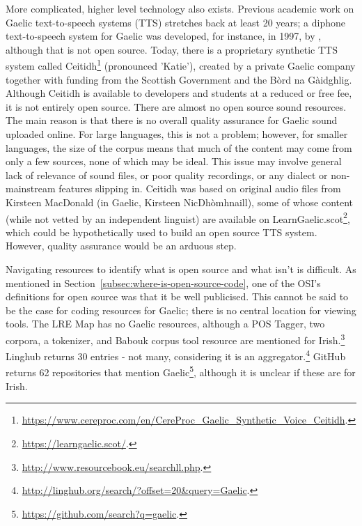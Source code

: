  More complicated, higher level technology also exists. Previous academic work on Gaelic text-to-speech systems (TTS) stretches back at least 20 years; a diphone text-to-speech system for Gaelic was developed, for instance, in 1997, by \citet{wolters1997diphone}, although that is not open source. Today, there is a proprietary synthetic TTS system called Ceitidh\footnote{\href{https://www.cereproc.com/en/CereProc_Gaelic_Synthetic_Voice_Ceitidh}{https://www.cereproc.com/en/CereProc\_Gaelic\_Synthetic\_Voice\_Ceitidh}. } (pronounced 'Katie'), created by a private Gaelic company together with funding from the Scottish Government and the B\`ord na G\`aidghlig. Although Ceitidh is available to developers and students at a reduced or free fee, it is not entirely open source. There are almost no open source sound resources. The main reason is that there is no overall quality assurance for Gaelic sound uploaded online. For large languages, this is not a problem; however, for smaller languages, the size of the corpus means that much of the content may come from only a few sources, none of which may be ideal. This issue may involve general lack of relevance of sound files, or poor quality recordings, or any dialect or non-mainstream features slipping in. Ceitidh was based on original audio files from Kirsteen MacDonald (in Gaelic, Kirsteen NicDh\`{o}mhnaill), some of whose content (while not vetted by an independent linguist) are available on LearnGaelic.scot\footnote{\href{https://learngaelic.scot/}{https://learngaelic.scot/}. }, which could be hypothetically used to build an open source TTS system. However, quality assurance would be an arduous step.

Navigating resources to identify what is open source and what isn't is difficult. As mentioned in Section~\ref{subsec:where-is-open-source-code}, one of the OSI's definitions for open source was that it be well publicised. This cannot be said to be the case for coding resources for Gaelic; there is no central location for viewing tools. The LRE Map has no Gaelic resources, although a POS Tagger, two corpora, a tokenizer, and Babouk corpus tool resource are mentioned for Irish.\footnote{\href{http://www.resourcebook.eu/searchll.php}{http://www.resourcebook.eu/searchll.php}. } Linghub returns 30 entries - not many, considering it is an aggregator.\footnote{\href{http://linghub.org/search/?offset=20&query=Gaelic}{http://linghub.org/search/?offset=20\&query=Gaelic}. } GitHub returns 62 repositories that mention Gaelic\footnote{\href{https://github.com/search?q=gaelic}{https://github.com/search?q=gaelic}. }, although it is unclear if these are for Irish.

